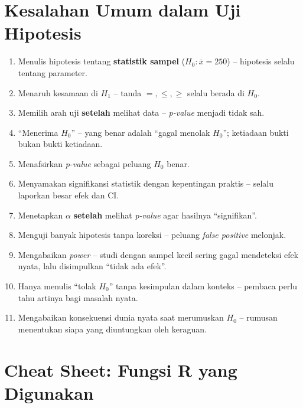 \documentclass[
  indonesian,
  letterpaper,
]{book}
\providecommand{\tightlist}{%
  \setlength{\itemsep}{0pt}\setlength{\parskip}{0pt}}
\begin{document}

\chapter{Kesalahan Umum dalam Uji
Hipotesis}\label{kesalahan-umum-dalam-uji-hipotesis}

\begin{enumerate}
\def\labelenumi{\arabic{enumi}.}
\tightlist
\item
  Menulis hipotesis tentang \textbf{statistik sampel}
  (\(H_0: \bar{x} = 250\)) -- hipotesis selalu tentang parameter.
\item
  Menaruh kesamaan di \(H_1\) -- tanda \(=, \le, \ge\) selalu berada di
  \(H_0\).
\item
  Memilih arah uji \textbf{setelah} melihat data -- \emph{p-value}
  menjadi tidak sah.
\item
  ``Menerima \(H_0\)'' -- yang benar adalah ``gagal menolak \(H_0\)'';
  ketiadaan bukti bukan bukti ketiadaan.
\item
  Menafsirkan \emph{p-value} sebagai peluang \(H_0\) benar.
\item
  Menyamakan signifikansi statistik dengan kepentingan praktis -- selalu
  laporkan besar efek dan CI.
\item
  Menetapkan \(\alpha\) \textbf{setelah} melihat \emph{p-value} agar
  hasilnya ``signifikan''.
\item
  Menguji banyak hipotesis tanpa koreksi -- peluang \emph{false
  positive} melonjak.
\item
  Mengabaikan \emph{power} -- studi dengan sampel kecil sering gagal
  mendeteksi efek nyata, lalu disimpulkan ``tidak ada efek''.
\item
  Hanya menulis ``tolak \(H_0\)'' tanpa kesimpulan dalam konteks --
  pembaca perlu tahu artinya bagi masalah nyata.
\item
  Mengabaikan konsekuensi dunia nyata saat merumuskan \(H_0\) -- rumusan
  menentukan siapa yang diuntungkan oleh keraguan.
\end{enumerate}


\chapter{Cheat Sheet: Fungsi R yang
Digunakan}\label{cheat-sheet-fungsi-r-yang-digunakan-1}
\end{document}
